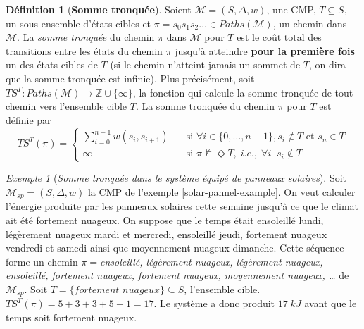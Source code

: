 \documentclass[12pt,a4paper]{report}
\theoremstyle{definition}%
\newtheorem{definition}{Définition}[chapter]
\newtheorem{propriete}{Propriété}[chapter]
\theoremstyle{remark}
\newtheorem{example}{Exemple}[chapter]
\newcommand{\ie}{i.e., }
\newcommand{\pr}{\mathbb{P}}
\begin{document}
\begin{definition}[\textbf{Somme tronquée}]
	Soient $\mathcal{M} = (S, \Delta, w)$, une CMP, $T \subseteq S$, un sous-ensemble d'états cibles et $\pi = s_0s_1s_2 \dots \in Paths(\mathcal{M})$, un chemin dans $\mathcal{M}$. La \textit{somme tronquée} du chemin $\pi$ dans $\mathcal{M}$ pour $T$ est le coût total des transitions entre les états du chemin $\pi$ jusqu'à atteindre \textbf{pour la première fois} un des états cibles de $T$ (si le chemin n'atteint jamais un sommet de $T$, on dira que la somme tronquée est infinie).
	Plus précisément,
	soit $TS^T : Paths(\mathcal{M}) \rightarrow \mathbb{Z} \cup \{\infty\}$, la fonction qui calcule la somme tronquée de tout chemin vers l'ensemble cible $T$. La somme tronquée du chemin $\pi$ pour $T$ est définie par
	\[
		TS^T(\pi) =
		\begin{cases}
			\sum_{i = 0}^{n-1} w(s_i, s_{i+1}) & \quad \text{si } \forall i \in \{0, \dots, n - 1\}, s_i \notin T \text{ et } s_n \in T \\
			\infty & \quad \text{si } \pi \not \models \Diamond T,\; \ie \; \forall i \;\; s_i \notin T
		\end{cases}
	\]
\end{definition}

\begin{example}[\textit{Somme tronquée dans le système équipé de panneaux solaires}]
	Soit $\mathcal{M}_{sp}=(S, \Delta, w)$ la CMP de l'exemple \ref{solar-pannel-example}. On veut calculer l'énergie produite par les panneaux solaires cette semaine jusqu'à ce que le climat ait été fortement nuageux. On suppose que le temps était ensoleillé lundi, légèrement nuageux mardi et mercredi, ensoleillé jeudi, fortement nuageux vendredi et samedi ainsi que moyennement nuageux dimanche. Cette séquence forme un chemin $\pi = $\textit{ensoleillé, légèrement nuageux, légèrement nuageux, ensoleillé, fortement nuageux, fortement nuageux, moyennement nuageux, \dots} de $\mathcal{M}_{sp}$. Soit $T = \{\textit{fortement nuageux}\} \subseteq S$, l'ensemble cible. $TS^T(\pi) = 5 + 3 + 3 + 5 + 1 = 17$. Le système a donc produit $17\; kJ$ avant que le temps soit fortement nuageux.
\end{example}

\end{document}
